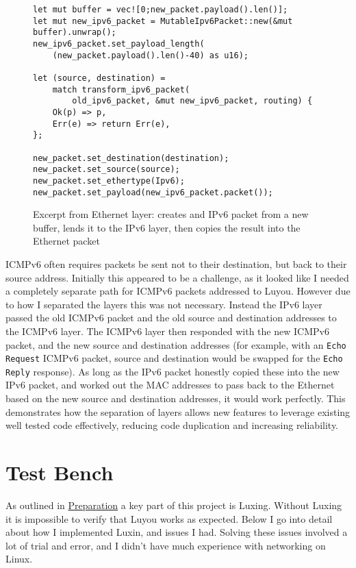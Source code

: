 \documentclass[12pt,a4paper,twoside,openright]{report}
\begin{document}
\begin{figure}
\centering
\begin{varwidth}{\linewidth}
\begin{verbatim}
let mut buffer = vec![0;new_packet.payload().len()];
let mut new_ipv6_packet = MutableIpv6Packet::new(&mut buffer).unwrap();
new_ipv6_packet.set_payload_length(
    (new_packet.payload().len()-40) as u16);

let (source, destination) = 
    match transform_ipv6_packet(
        old_ipv6_packet, &mut new_ipv6_packet, routing) {
    Ok(p) => p,
    Err(e) => return Err(e),
};

new_packet.set_destination(destination);
new_packet.set_source(source);
new_packet.set_ethertype(Ipv6);
new_packet.set_payload(new_ipv6_packet.packet());
\end{verbatim}
\end{varwidth}
\caption{Excerpt from Ethernet layer: creates and IPv6 packet from a new buffer, lends it to the IPv6 layer, then copies the result into the Ethernet packet}
\label{fig::mutability}
\end{figure}

\bigskip

ICMPv6 often requires packets be sent not to their destination, but back to their source address.  Initially this appeared to be a challenge, as it looked like I needed a completely separate path for ICMPv6 packets addressed to Luyou. However due to how I separated the layers this was not necessary. Instead the IPv6 layer passed the old ICMPv6 packet and the old source and destination addresses to the ICMPv6 layer. The ICMPv6 layer then responded with the new ICMPv6 packet, and the new source and destination addresses (for example, with an \verb!Echo Request! ICMPv6 packet, source and destination would be swapped for the \verb!Echo Reply! response).  As long as the IPv6 packet honestly copied these into the new IPv6 packet, and worked out the MAC addresses to pass back to the Ethernet based on the new source and destination addresses, it would work perfectly. This demonstrates how the separation of layers allows new features to leverage existing well tested code effectively, reducing code duplication and increasing reliability.

\section{Test Bench}

As outlined in \hyperref[chap::preparation]{Preparation} a key part of this project is Luxing. Without Luxing it is impossible to verify that Luyou works as expected.  Below I go into detail about how I implemented Luxin, and issues I had.  Solving these issues involved a lot of trial and error, and I didn't have much experience with networking on Linux.
\end{document}
